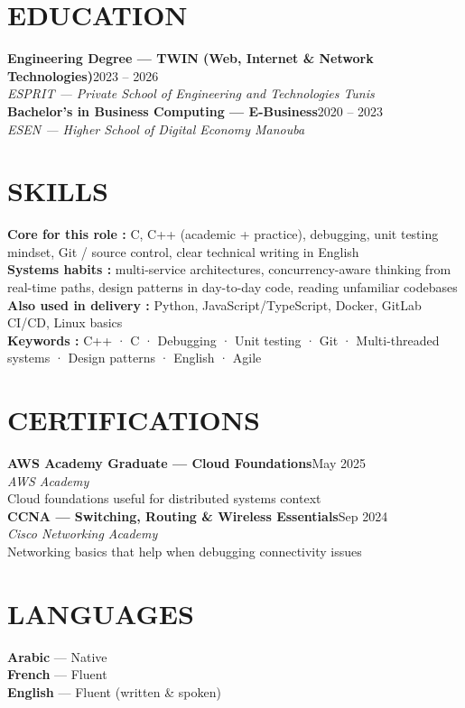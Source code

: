 \documentclass[10pt,a4paper]{article}
\newcommand{\TargetKeywords}{C++ · C · Debugging · Unit testing · Git · Multi-threaded systems · Design patterns · English · Agile}
\newcommand{\edu}[3]{%
  \textbf{\color{primary}#1}\hfill{\color{muted}\small #2}\\[-1pt]
  {\color{accent}\textit{#3}}\\[3pt]
}
\newcommand{\cert}[4]{%
  \textbf{\color{primary}\small #1}\hfill{\color{muted}\scriptsize #3}\\[-1pt]
  {\color{accent}\small\textit{#2}}\\[0pt]
  {\color{muted}\scriptsize #4}\\[4pt]
}
\begin{document}
\section{EDUCATION}
\edu{Engineering Degree — TWIN (Web, Internet \& Network Technologies)}{2023 -- 2026}{ESPRIT — Private School of Engineering and Technologies \textbar{} Tunis}
\edu{Bachelor's in Business Computing — E-Business}{2020 -- 2023}{ESEN — Higher School of Digital Economy \textbar{} Manouba}

\section{SKILLS}
{\small
\textbf{\color{primary}Core for this role :} C, C++ (academic + practice), debugging, unit testing mindset, Git / source control, clear technical writing in English\\[2pt]
\textbf{\color{primary}Systems habits :} multi-service architectures, concurrency-aware thinking from real-time paths, design patterns in day-to-day code, reading unfamiliar codebases\\[2pt]
\textbf{\color{primary}Also used in delivery :} Python, JavaScript/TypeScript, Docker, GitLab CI/CD, Linux basics\\[2pt]
\textbf{\color{primary}Keywords :} \TargetKeywords
}

\vspace{2pt}
\begin{minipage}[t]{0.68\textwidth}
\section{CERTIFICATIONS}
\cert{AWS Academy Graduate — Cloud Foundations}{AWS Academy}{May 2025}{Cloud foundations useful for distributed systems context}
\cert{CCNA — Switching, Routing \& Wireless Essentials}{Cisco Networking Academy}{Sep 2024}{Networking basics that help when debugging connectivity issues}
\end{minipage}%
\hfill
\begin{minipage}[t]{0.28\textwidth}
\section{LANGUAGES}
{\small\textbf{Arabic} — Native}\\[2pt]
{\small\textbf{French} — Fluent}\\[2pt]
{\small\textbf{English} — Fluent (written \& spoken)}
\end{minipage}
\end{document}
